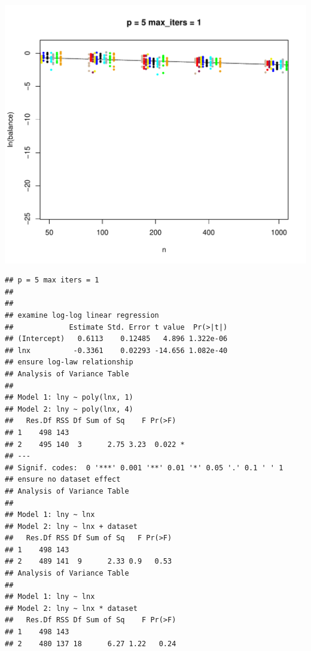 \documentclass{article}\usepackage[]{graphicx}\usepackage[]{color}
\makeatletter
\def\maxwidth{ %
  \ifdim\Gin@nat@width>\linewidth
    \linewidth
  \else
    \Gin@nat@width
  \fi
}
\newenvironment{kframe}{%
 \def\at@end@of@kframe{}%
 \ifinner\ifhmode%
  \def\at@end@of@kframe{\end{minipage}}%
  \begin{minipage}{\columnwidth}%
 \fi\fi%
 \def\FrameCommand##1{\hskip\@totalleftmargin \hskip-\fboxsep
 \colorbox{shadecolor}{##1}\hskip-\fboxsep
     \hskip-\linewidth \hskip-\@totalleftmargin \hskip\columnwidth}%
 \MakeFramed {\advance\hsize-\width
   \@totalleftmargin\z@ \linewidth\hsize
   \@setminipage}}%
 {\par\unskip\endMakeFramed%
 \at@end@of@kframe}
\newenvironment{knitrout}{}{} %
\makeatother
\begin{document}
\begin{knitrout}
\includegraphics[width=\maxwidth]{figure/load_and_cleanup_data11} 
\begin{kframe}\begin{verbatim}
## p = 5 max iters = 1 
## 
## 
## examine log-log linear regression
##             Estimate Std. Error t value  Pr(>|t|)
## (Intercept)   0.6113    0.12485   4.896 1.322e-06
## lnx          -0.3361    0.02293 -14.656 1.082e-40
## ensure log-law relationship
## Analysis of Variance Table
## 
## Model 1: lny ~ poly(lnx, 1)
## Model 2: lny ~ poly(lnx, 4)
##   Res.Df RSS Df Sum of Sq    F Pr(>F)  
## 1    498 143                           
## 2    495 140  3      2.75 3.23  0.022 *
## ---
## Signif. codes:  0 '***' 0.001 '**' 0.01 '*' 0.05 '.' 0.1 ' ' 1
## ensure no dataset effect
## Analysis of Variance Table
## 
## Model 1: lny ~ lnx
## Model 2: lny ~ lnx + dataset
##   Res.Df RSS Df Sum of Sq   F Pr(>F)
## 1    498 143                        
## 2    489 141  9      2.33 0.9   0.53
## Analysis of Variance Table
## 
## Model 1: lny ~ lnx
## Model 2: lny ~ lnx * dataset
##   Res.Df RSS Df Sum of Sq    F Pr(>F)
## 1    498 143                         
## 2    480 137 18      6.27 1.22   0.24
\end{verbatim}
\end{kframe}

\end{knitrout}
\end{document}
